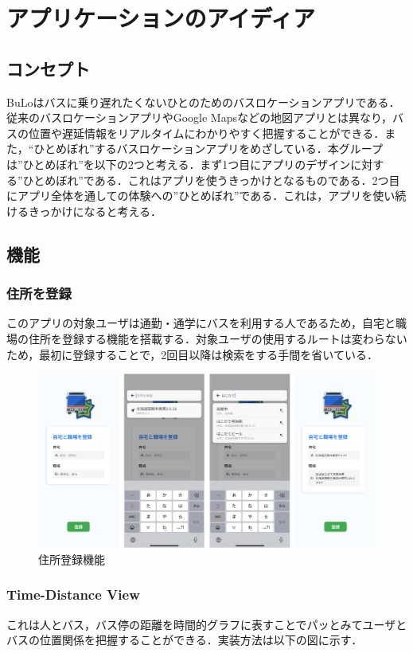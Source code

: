 \chapter{アプリケーションのアイディア}

\section{コンセプト}
BuLoはバスに乗り遅れたくないひとのためのバスロケーションアプリである．従来のバスロケーションアプリやGoogle Mapsなどの地図アプリとは異なり，バスの位置や遅延情報をリアルタイムにわかりやすく把握することができる．また，“ひとめぼれ”するバスロケーションアプリをめざしている．本グループは”ひとめぼれ”を以下の2つと考える．まず1つ目にアプリのデザインに対する”ひとめぼれ”である．これはアプリを使うきっかけとなるものである．2つ目にアプリ全体を通しての体験への”ひとめぼれ”である．これは，アプリを使い続けるきっかけになると考える．

\section{機能}
\subsection{住所を登録}
このアプリの対象ユーザは通勤・通学にバスを利用する人であるため，自宅と職場の住所を登録する機能を搭載する．対象ユーザの使用するルートは変わらないため，最初に登録することで，2回目以降は検索をする手間を省いている．

\begin{figure}[htbp]
    \centering
    \includegraphics[width=12cm]{images/feature_registration.png}
    \caption{住所登録機能}
    \label{fig:feature_registration}
\end{figure}

\subsection{Time-Distance View}
これは人とバス，バス停の距離を時間的グラフに表すことでパッとみてユーザとバスの位置関係を把握することができる．実装方法は以下の図に示す．


